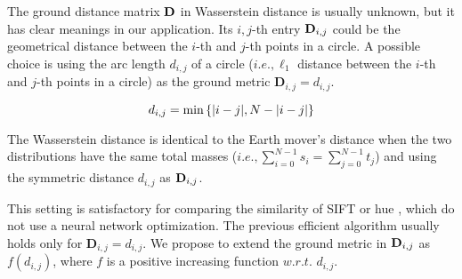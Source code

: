 The ground distance matrix ${\rm\textbf{D}}$ in Wasserstein distance is usually unknown, but it has clear meanings in our application. Its $i,j$-th entry ${\rm\textbf{D}}_{i,j}$ could be the geometrical distance between the $i$-th and $j$-th points in a circle. A possible choice is using the arc length ${d_{i,j}}$ of a circle ($i.e., \ell_1$ distance between the $i$-th and $j$-th points in a circle) as the ground metric $\textbf{D}_{i,j}={d_{i,j}}$.

\begin{equation}
d_{i,j}={\rm min}\left\{|i-j|,N-|i-j|\right\} \label{con:d}
\end{equation}  


The Wasserstein distance is identical to the Earth mover's distance when the two distributions have the same total masses ($i.e., \sum_{i=0}^{N-1}s_i=\sum_{j=0}^{N-1}t_j$) and using the symmetric distance $d_{i,j}$ as ${\rm\textbf{D}}_{i,j}$.



This setting is satisfactory for comparing the similarity of SIFT or hue \cite{rubner2000earth}, which do not use a neural network optimization. The previous efficient algorithm usually holds only for $\textbf{D}_{i,j}={d_{i,j}}$. We propose to extend the ground metric in ${\rm\textbf{D}}_{i,j}$ as $f(d_{i,j})$, where $f$ is a positive increasing function $w.r.t.$ $d_{i,j}$. 






 